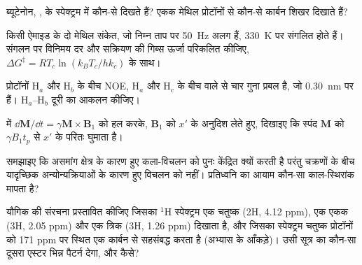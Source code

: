 \begin{exercise}[$\star\star$]\label{exo:b3:advanced-nmr:7}
ब्यूटेनोन, , के  स्पेक्ट्रम में कौन-से  दिखते हैं?
एकक मेथिल प्रोटॉनों से कौन-से कार्बन  शिखर दिखाते हैं?
\end{exercise}

\begin{exercise}[$\star\star$]\label{exo:b3:advanced-nmr:8}
किसी ऐमाइड के दो मेथिल संकेत, जो निम्न ताप पर \qty{50}{Hz} अलग हैं,
\qty{330}{K} पर संगलित होते हैं। संगलन पर विनिमय दर और सक्रियण की गिब्स ऊर्जा
परिकलित कीजिए, $\Delta G^\ddagger = RT_c\ln(k_BT_c/hk_c)$ के साथ।
\end{exercise}

\begin{exercise}[$\star\star$]\label{exo:b3:advanced-nmr:9}
प्रोटॉनों H$_a$ और H$_b$ के बीच NOE, H$_a$ और
H$_c$ के बीच वाले से चार गुना प्रबल है, जो \qty{0.30}{nm} पर हैं। H$_a$--H$_b$ दूरी का आकलन कीजिए।
\end{exercise}

\begin{exercise}[$\star\star\star$]\label{exo:b3:advanced-nmr:10}
 में $\dd\mathbf M/\dd t = \gamma\mathbf M\times\mathbf B_1$ को हल करके,
$\mathbf B_1$ को $x'$ के अनुदिश लेते हुए, दिखाइए कि स्पंद $\mathbf M$ को $\gamma B_1t_p$ से $x'$ के परितः घुमाता है।
\end{exercise}

\begin{exercise}[$\star\star\star$]\label{exo:b3:advanced-nmr:11}
समझाइए कि  असमांग क्षेत्र के कारण हुए कला-विचलन को पुनः केंद्रित
क्यों करती है परंतु चक्रणों के बीच यादृच्छिक अन्योन्यक्रियाओं के कारण हुए विचलन को नहीं। प्रतिध्वनि का
आयाम कौन-सा काल-स्थिरांक मापता है?
\end{exercise}

\begin{exercise}[$\star\star\star$]\label{exo:b3:advanced-nmr:12}
 यौगिक की संरचना प्रस्तावित कीजिए जिसका ${}^1$H स्पेक्ट्रम एक
चतुष्क (2H, 4.12 ppm), एक एकक (3H, 2.05 ppm) और एक त्रिक (3H,
1.26 ppm) दिखाता है, और जिसका  स्पेक्ट्रम चतुष्क प्रोटॉनों को
171 ppm पर स्थित एक कार्बन से सहसंबद्ध करता है (अभ्यास के आँकड़े)। उसी सूत्र का कौन-सा
दूसरा एस्टर भिन्न  पैटर्न देगा, और कैसे?
\end{exercise}

